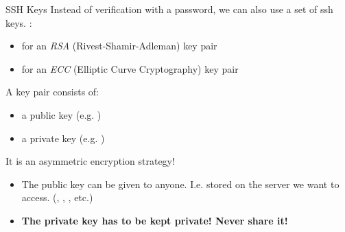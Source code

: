 \documentclass{setbeamer}
\begin{document}
\begin{frame}{SSH Keys}
    Instead of verification with a password, we can also use a set of ssh keys. :
    \begin{itemize}
        \item {} for an \emph{RSA} (Rivest-Shamir-Adleman) key pair
        \item {} for an \emph{ECC} (Elliptic Curve Cryptography) key pair
    \end{itemize}

    \vspace{0.3cm}

    A key pair consists of:
    \begin{itemize}
        \item a public key (e.g. )
        \item a private key (e.g. )
    \end{itemize}
    {\Large \MVRightarrow} It is an asymmetric encryption strategy!

    \vspace{0.3cm}

    \begin{itemize}
        \item The public key can be given to anyone. I.e. stored on the server we want to access. (, , , etc.)
        \item \textbf{The private key has to be kept private! Never share it!}
    \end{itemize}
\end{frame}

\end{document}
